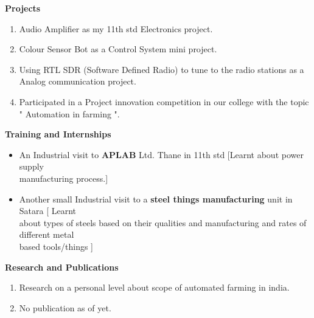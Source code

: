\documentclass[12pt]{article}
\begin{document}
\begin{flushleft}
\vspace{8mm} 
\textbf{Projects}\\
\begin{enumerate}
	\item Audio Amplifier as my 11th std Electronics project.
	\item Colour Sensor Bot as a Control System mini project.
	\item Using RTL SDR (Software Defined Radio) to tune to the radio stations as a Analog communication project.
	\item Participated in a Project innovation competition in our college with the topic " Automation in farming ".
	
\end{enumerate}

\vspace{30mm} 
\textbf{Training and Internships}
\begin{itemize}
	\item An Industrial visit to \textbf{APLAB} Ltd. Thane in 11th std [Learnt about power supply \\manufacturing process.]
	\item Another small Industrial visit to a \textbf{steel things manufacturing} unit in Satara [ Learnt \\about types of steels based on their qualities and manufacturing and rates of different metal \\based tools/things ]
\end{itemize}

\vspace{5mm}
\textbf{Research and Publications}\\
\vspace{7mm}
\begin{enumerate}
	\item Research on a personal level about scope of automated farming in india.
	\item No publication as of yet.
\end{enumerate}
\end{flushleft}
\end{document}

